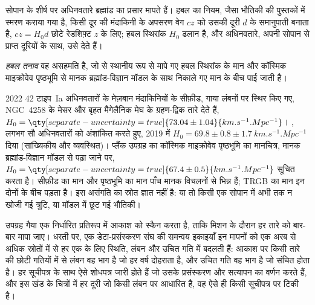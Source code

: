 सोपान के शीर्ष पर अधिनवतारे ब्रह्मांड का प्रसार मापते हैं।
हबल का नियम, जैसा भौतिकी की पुस्तकों में स्मरण कराया गया है,
किसी दूर की मंदाकिनी के अपसरण वेग $cz$ को उसकी दूरी $d$ के समानुपाती
बनाता है, $cz = H_0 d$ छोटे रेडशिफ़्ट $z$ के लिए; हबल स्थिरांक $H_0$
ढलान है, और अधिनवतारे, अपनी सोपान से प्राप्त दूरियों के साथ, उसे देते हैं।

\begin{definition}[हबल तनाव]\label{def:b3:milky-way-galaxies:tension}
\emph{हबल तनाव} वह असहमति है, जो  से
स्थानीय रूप से मापे गए हबल स्थिरांक के मान और
कॉस्मिक माइक्रोवेव पृष्ठभूमि से मानक ब्रह्मांड-विज्ञान मॉडल के साथ
निकाले गए मान के बीच पाई जाती है।
\end{definition}

\begin{dated}{2022}
42 टाइप~Ia अधिनवतारों के मेज़बान मंदाकिनियों के सीफ़ीड, गाया लंबनों पर स्थिर किए गए,
NGC~4258 के मेसर और बृहत मैगेलैनिक मेघ के ग्रहण-द्विक तारे
देते हैं,
$H_0 = \qty[separate-uncertainty=true]{73.04 \pm 1.04}{km.s^{-1}.Mpc^{-1}}$।
, लगभग सौ अधिनवतारों को अंशांकित करते हुए,
2019 में $H_0 = 69.8 \pm 0.8 \pm \qty{1.7}{km.s^{-1}.Mpc^{-1}}$ दिया
(सांख्यिकीय और व्यवस्थित)। प्लैंक उपग्रह का कॉस्मिक
माइक्रोवेव पृष्ठभूमि का मानचित्र, मानक ब्रह्मांड-विज्ञान मॉडल से पढ़ा जाने पर,
$H_0 = \qty[separate-uncertainty=true]{67.4 \pm 0.5}{km.s^{-1}.Mpc^{-1}}$ सूचित करता है।
सीफ़ीड का मान और पृष्ठभूमि का मान पाँच मानक
विचलनों से भिन्न हैं; TRGB का मान इन दोनों के बीच पड़ता है। इस असंगति का
स्रोत ज्ञात नहीं है: या तो किसी एक सोपान में अभी तक न खोजी गई त्रुटि,
या मॉडल में छूट गई भौतिकी।
\end{dated}

\begin{inthelab}
उपग्रह गैया एक निर्धारित प्रतिरूप में आकाश को स्कैन करता है, ताकि
मिशन के दौरान हर तारे को बार-बार मापा जाए। धरती पर, एक डेटा-प्रसंस्करण संघ की
समन्वय इकाइयाँ इन मापनों को
एक अरब से अधिक स्रोतों में से हर एक के लिए स्थिति, लंबन और उचित गति में बदलती हैं:
आकाश पर किसी तारे की छोटी गतियों में से
लंबन वह भाग है जो हर वर्ष दोहराता है, और उचित गति
वह भाग है जो संचित होता है। हर सूचीपत्र के साथ ऐसे शोधपत्र जारी होते हैं जो
उसके प्रसंस्करण और सत्यापन का वर्णन करते हैं, और इस खंड के चित्रों में हर दूरी
जो किसी लंबन पर आधारित है, वह ऐसे ही किसी
सूचीपत्र पर टिकी है।
\end{inthelab}

